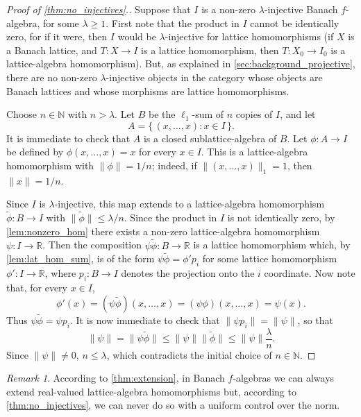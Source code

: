 \documentclass{memo-l}
\theoremstyle{definition}
\theoremstyle{remark}
\newtheorem{rem}[theorem]{Remark}
\numberwithin{section}{chapter}
\numberwithin{equation}{chapter}
\newcommand\N{\ensuremath{\mathbb{N}}}
\newcommand\R{\ensuremath{\mathbb{R}}}
\newcommand{\el}[1]{\ensuremath{\ell_{#1}}}
\newcommand{\falg}{$f\!$-algebra}
\begin{document}
\begin{proof}[Proof of \cref{thm:no_injectives}.]
    Suppose that $I$ is a non-zero $\lambda $-injective Banach \falg, for
    some $\lambda \ge 1$. First note that the product in $I$ cannot be
    identically zero, for if it were, then $I$ would be $\lambda
    $-injective for lattice homomorphisms (if $X$ is a Banach lattice, and
    $T\colon X\to I$ is a lattice homomorphism, then $T\colon X_0\to
    I_0$ is a lattice-algebra homomorphism). But, as explained in
    \cref{sec:background_projective}, there are no non-zero $\lambda
    $-injective objects in the category whose objects are Banach
    lattices and whose morphisms are lattice homomorphisms.

    Choose $n \in \N$ with $n> \lambda $. Let
    $B$ be the $\el 1$-sum of $n$ copies of $I$, and let
    \[
    A=\{\, (x,\ldots ,x) : x \in I \, \}.
    \]
    It is immediate to check that $A$ is a closed sublattice-algebra
    of $B$. Let $\phi \colon A\to I$ be defined by $\phi (x,\ldots
    ,x)=x$ for every $x \in I$. This is a
    lattice-algebra homomorphism with $\|\phi \|=1/n$; indeed, if
    $\|(x,\ldots ,x)\|_1=1$, then $\|x\|=1/n$.

    Since $I$ is $\lambda $-injective, this map extends to a
    lattice-algebra homomorphism $\tilde \phi \colon B\to I$ with
    $\|\tilde \phi \|\le \lambda /n$. Since the product in $I$ is not
    identically zero, by \cref{lem:nonzero_hom}
    there exists a non-zero lattice-algebra homomorphism $\psi \colon
    I\to \R$. Then the composition $\psi \tilde \phi \colon B\to \R$ is a
    lattice homomorphism which, by \cref{lem:lat_hom_sum}, is of the
    form $\psi \tilde \phi =\phi 'p_i$ for some lattice homomorphism
    $\phi '\colon I\to \R$, where $p_i\colon B\to I$ denotes the
    projection onto the $i$ coordinate. Now note that, for every $x
    \in I$,
    \[
    \phi '(x)=(\psi \tilde \phi )(x,\ldots ,x)=(\psi \phi )(x,\ldots
    ,x)=\psi (x).
    \]
    Thus $\psi \tilde \phi = \psi p_i$. It is now immediate to check
    that $\|\psi p_i\|=\|\psi \|$, so that
    \[
    \|\psi \|=\|\psi \tilde \phi \|\le \|\psi \| \|\tilde \phi \|\le
    \|\psi \| \frac{\lambda }{n}.
    \]
    Since $\|\psi \|\neq 0$, $n\le \lambda $, which contradicts the
    initial choice of $n \in \N$.
\end{proof}

\begin{rem}
    According to \cref{thm:extension}, in Banach \falg s we can always
    extend real-valued lattice-algebra homomorphisms but, according to
    \cref{thm:no_injectives}, we can never do so with a uniform
    control over the norm.
\end{rem}
\end{document}
